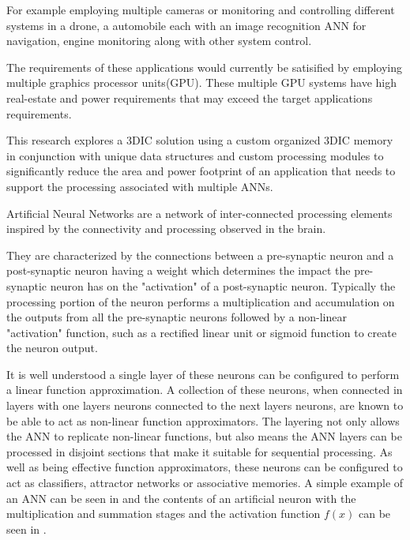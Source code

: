 For example employing multiple cameras or monitoring and controlling different systems in a drone, a automobile each with an image recognition ANN\cite{krizhevsky2012imagenet}\cite{bojarski2016end} for navigation, engine monitoring along with other system control.
\fi

The requirements of these applications would currently be satisified by employing multiple graphics processor units(GPU).
These multiple GPU systems have high real-estate and power requirements that may exceed the target applications requirements.

This research explores a 3DIC solution using a custom organized 3DIC memory in conjunction with unique data structures and custom processing modules to significantly reduce the 
area and power footprint of an application that needs to support the processing associated with multiple ANNs.


Artificial Neural Networks are a network of inter-connected processing elements inspired by the 
connectivity and processing observed in the brain.

They are characterized by the connections between a pre-synaptic neuron and a post-synaptic neuron having a weight which determines the impact the pre-synaptic neuron has on the 
"activation" of a post-synaptic neuron.
Typically the processing portion of the neuron performs a multiplication and accumulation on the outputs from all
the pre-synaptic neurons followed by a non-linear "activation" function, such as a rectified linear unit or sigmoid function to create the neuron output.

It is well understood a single layer of these neurons can be configured to perform a linear function approximation.
A collection of these neurons, when connected in layers with one layers neurons connected to
the next layers neurons, are known to be able to act as non-linear function approximators.
The layering not only allows the ANN to replicate non-linear functions, but also means the ANN layers can be processed in disjoint sections that make it suitable for sequential processing.
As well as being effective function approximators, these neurons can be configured to act as 
classifiers, attractor networks or associative memories.
A simple example of an ANN can be seen in  and the contents of an artificial neuron 
with the multiplication and summation stages and the activation function $f(x)$ can be seen in . 


